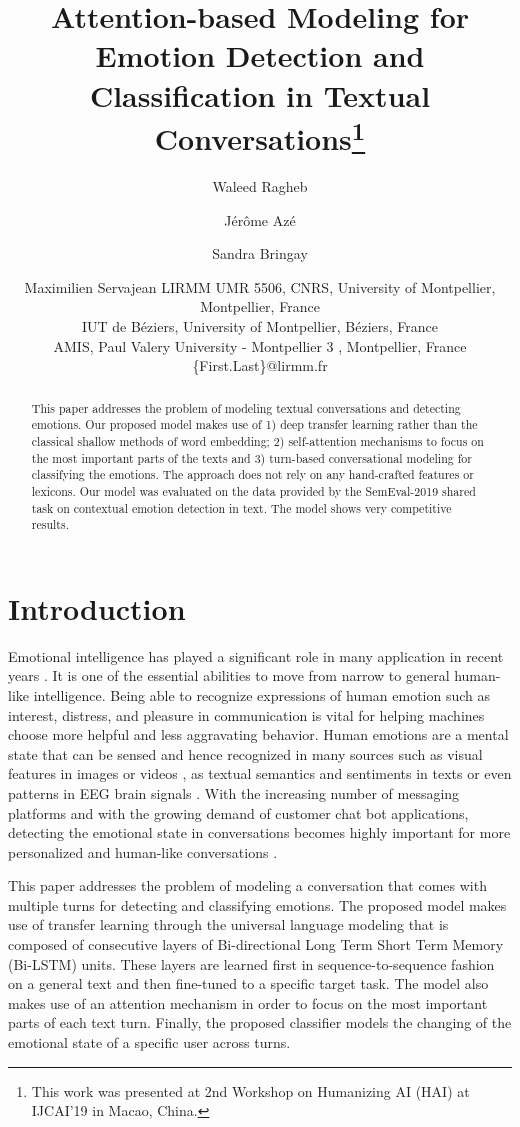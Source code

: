 \documentclass{article}
\title{ Attention-based Modeling for Emotion Detection and Classification in Textual Conversations\footnote{This work was presented at 2nd Workshop on Humanizing AI (HAI) at IJCAI'19 in Macao, China.}}
\author{
Waleed Ragheb \and 
 Jérôme Azé  \and
Sandra Bringay \and
Maximilien Servajean
\affiliations
LIRMM UMR 5506, CNRS, University of Montpellier, Montpellier, France\\
IUT de Béziers, University of Montpellier, Béziers, France\\
AMIS, Paul  Valery University - Montpellier 3 , Montpellier, France
\emails
\{First.Last\}@lirmm.fr
}
\begin{document}
\maketitle

\begin{abstract}
This paper addresses the problem of  modeling textual conversations and  detecting emotions. Our proposed model makes use of 1) deep transfer learning rather than the classical shallow methods of word embedding; 2)  self-attention mechanisms to focus on the most important parts of the texts and 3) turn-based conversational modeling for classifying the emotions. The approach does not rely on any hand-crafted features or lexicons.
Our model was evaluated on the data provided by the SemEval-2019 shared task on contextual emotion detection in text. The model shows very competitive results.

\end{abstract}



\section{Introduction}
Emotional intelligence has played a significant role in many application in recent years \cite{Krakovsky:2018:AI:3200906.3185521}.
It is one of the essential abilities to move from narrow to general human-like intelligence. Being able to recognize expressions of human emotion such as interest, distress, and pleasure in communication is vital for helping machines choose more helpful and less aggravating behavior. Human emotions are a mental state that can be sensed and hence recognized in many sources such as visual features in images or videos \cite{emoimg}, as textual semantics and sentiments in texts \cite{emotext} or even patterns in  EEG brain signals \cite{egg}. With the increasing number of messaging platforms and with the growing demand of customer chat bot applications, detecting the emotional state in conversations becomes highly important for more personalized and human-like conversations \cite{5-chatbot}.

This paper addresses the problem of modeling a conversation that comes with multiple turns for detecting and classifying emotions. The proposed model makes use of transfer learning through the universal language modeling that is composed of consecutive layers of Bi-directional Long Term Short Term Memory (Bi-LSTM) units. These layers are learned first in sequence-to-sequence fashion on a general text and then fine-tuned to a specific target task. The model also makes use of an attention mechanism in order to focus on the most important parts of each text turn. Finally, the proposed classifier models the changing of the emotional state of a specific user across turns.
\end{document}
